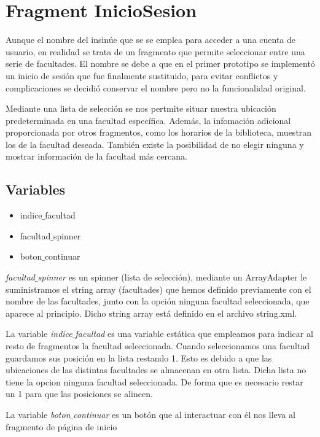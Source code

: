 \section{Fragment InicioSesion}
Aunque el nombre del insinúe que se se emplea para acceder a una cuenta de usuario, en realidad se trata de un fragmento que permite seleccionar entre una serie de facultades. El nombre se debe a que en el primer prototipo se implementó un inicio de sesión que fue finalmente sustituido, para evitar conflictos y complicaciones se decidió conservar el nombre pero no la funcionalidad original.

Mediante una lista de selección se nos pertmite situar nuestra ubicación predeterminada en una facultad específica. Además, la infomación adicional proporcionada por otros fragmentos, como los horarios de la biblioteca, muestran los de la facultad deseada. También existe la posibilidad de no elegir ninguna y mostrar información de la facultad más cercana.

\subsection{Variables}

\begin{itemize}
	\item indice$\_$facultad
	\item facultad$\_$spinner
	\item boton$\_$continuar
\end{itemize}

\textit{facultad$\_$spinner} es un spinner (lista de selección), mediante un ArrayAdapter le suministramos el string array (facultades) que hemos definido previamente con el nombre de las facultades, junto con la opción ninguna facultad seleccionada, que aparece al principio. Dicho string array está definido en el archivo string.xml.

La variable \textit{indice$\_$facultad} es una variable estática que empleamos para indicar al resto de fragmentos la facultad seleccionada. Cuando seleccionamos una facultad guardamos sus posición en la lista restando 1. Esto es debido a que las ubicaciones de las distintas facultades se almacenan en otra lista. Dicha lista no tiene la opcion ninguna facultad seleccionada. De forma que es necesario restar un 1 para que las posiciones se alineen.

La variable \textit{boton$\_$continuar} es un botón que al interactuar con él nos lleva al fragmento de página de inicio
